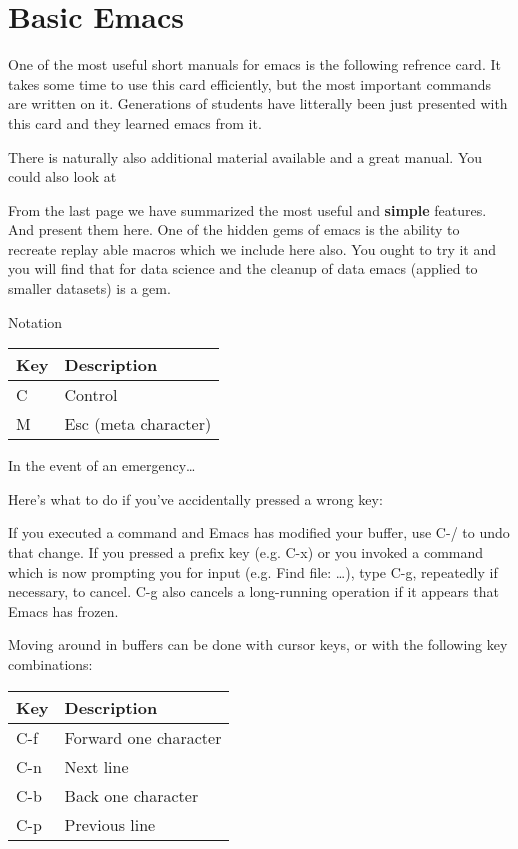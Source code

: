 \FILENAME

\section{Basic Emacs}\label{basic-emacs}

One of the most useful short manuals for emacs is the following refrence
card. It takes some time to use this card efficiently, but the most
important commands are written on it. Generations of students have
litterally been just presented with this card and they learned emacs
from it.



There is naturally also additional material available and a great
manual. You could also look at



From the last page we have summarized the most useful and
\textbf{simple} features. And present them here. One of the hidden gems
of emacs is the ability to recreate replay able macros which we include
here also. You ought to try it and you will find that for data science
and the cleanup of data emacs (applied to smaller datasets) is a gem.

Notation

\begin{longtable}[]{@{}ll@{}}
\toprule
Key & Description\tabularnewline
\midrule
\endhead
C & Control\tabularnewline
M & Esc (meta character)\tabularnewline
\bottomrule
\end{longtable}

In the event of an emergency\ldots{}

Here's what to do if you've accidentally pressed a wrong key:

If you executed a command and Emacs has modified your buffer, use C-/ to
undo that change. If you pressed a prefix key (e.g. C-x) or you invoked
a command which is now prompting you for input (e.g. Find file:
\ldots{}), type C-g, repeatedly if necessary, to cancel. C-g also
cancels a long-running operation if it appears that Emacs has frozen.

Moving around in buffers can be done with cursor keys, or with the
following key combinations:

\begin{longtable}[]{@{}ll@{}}
\toprule
Key & Description\tabularnewline
\midrule
\endhead
C-f & Forward one character\tabularnewline
C-n & Next line\tabularnewline
C-b & Back one character\tabularnewline
C-p & Previous line\tabularnewline
\bottomrule
\end{longtable}

